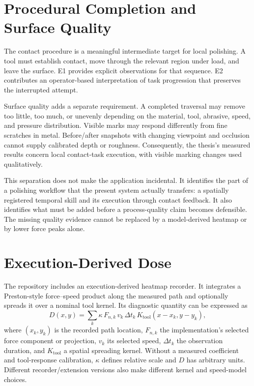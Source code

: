 \section{Procedural Completion and Surface Quality}
The contact procedure is a meaningful intermediate target for local polishing. A tool must establish contact, move through the relevant region under load, and leave the surface. E1 provides explicit observations for that sequence. E2 contributes an operator-based interpretation of task progression that preserves the interrupted attempt.

Surface quality adds a separate requirement. A completed traversal may remove too little, too much, or unevenly depending on the material, tool, abrasive, speed, and pressure distribution. Visible marks may respond differently from fine scratches in metal. Before/after snapshots with changing viewpoint and occlusion cannot supply calibrated depth or roughness. Consequently, the thesis's measured results concern local contact-task execution, with visible marking changes used qualitatively.

This separation does not make the application incidental. It identifies the part of a polishing workflow that the present system actually transfers: a spatially registered temporal skill and its execution through contact feedback. It also identifies what must be added before a process-quality claim becomes defensible. The missing quality evidence cannot be replaced by a model-derived heatmap or by lower force peaks alone.

\section{Execution-Derived Dose}
\label{chap:removal_estimation}
The repository includes an execution-derived heatmap recorder. It integrates a Preston-style force--speed product along the measured path and optionally spreads it over a nominal tool kernel. Its diagnostic quantity can be expressed as
\begin{equation}
 D(x,y)=\sum_k\kappa\,F_{n,k}\,v_k\,\Delta t_k\,
                 K_{\mathrm{tool}}(x-x_k,y-y_k),
 \label{eq:preston_spatial}
\end{equation}
where \((x_k,y_k)\) is the recorded path location, \(F_{n,k}\) the implementation's selected force component or projection, \(v_k\) its selected speed, \(\Delta t_k\) the observation duration, and \(K_{\mathrm{tool}}\) a spatial spreading kernel. Without a measured coefficient and tool-response calibration, \(\kappa\) defines relative scale and \(D\) has arbitrary units. Different recorder/extension versions also make different kernel and speed-model choices.

